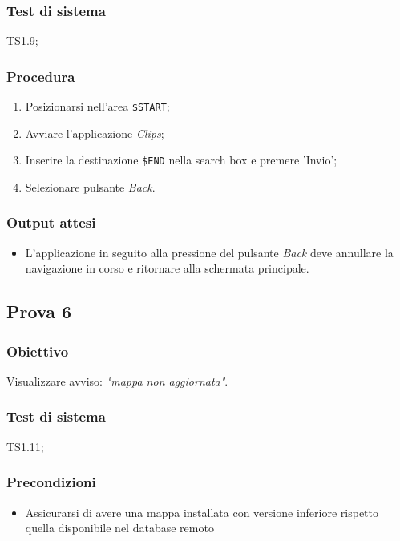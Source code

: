\documentclass[../SperimentazioniPratiche.tex]{subfiles}
\begin{document}
	\subsubsection{Test di sistema}
		TS1.9;
		
	\subsubsection{Procedura}
		\begin{enumerate}
		\item Posizionarsi nell'area  \verb|$START|;
		\item Avviare l'applicazione \textit{Clips};
		\item Inserire la destinazione  \verb|$END| nella search box e premere 'Invio';
		\item Selezionare pulsante \textit{Back}.
		\end{enumerate}
		
	\subsubsection{Output attesi}
		\begin{itemize}
		\item L'applicazione in seguito alla pressione del pulsante \textit{Back} deve annullare la navigazione in corso e ritornare alla schermata principale.
		\end{itemize}	
		
	
	
\newpage
\subsection{Prova 6} %
\label{subsec:Prova6}
	
	\subsubsection{Obiettivo}
		Visualizzare avviso: \textit{"mappa non aggiornata"}.
		
	\subsubsection{Test di sistema}
		TS1.11;
		
	\subsubsection{Precondizioni}
		\begin{itemize}
			\item Assicurarsi di avere una mappa installata con versione inferiore rispetto quella disponibile nel database remoto
		\end{itemize}
	
\end{document}
